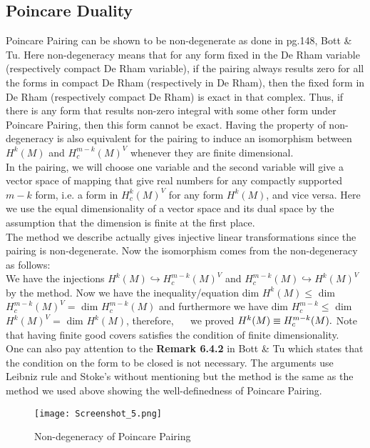 \documentclass[12pt]{amsart}
\theoremstyle{remark}
\begin{document}
\subsection{Poincare Duality}
\indent \indent Poincare Pairing can be shown to be non-degenerate as done in pg.148, Bott \& Tu. Here non-degeneracy means that for any form fixed in the De Rham variable (respectively compact De Rham variable), if the pairing always results zero for all the forms in compact De Rham (respectively in De Rham), then the fixed form in De Rham (respectively compact De Rham) is exact in that complex. Thus, if there is any form that results non-zero integral with some other form under Poincare Pairing, then this form cannot be exact. Having the property of non-degeneracy is also equivalent for the pairing to induce an isomorphism between $H^k (M)$ and $H_c^{m-k} (M)^V$ whenever they are finite dimensional. \\
\indent In the pairing, we will choose one variable and the second variable will give a vector space of mapping that give real numbers for any compactly supported $m-k$ form, i.e. a form in $H_c^k(M)^V$ for any form $H^k(M)$, and vice versa. Here we use the equal dimensionality of a vector space and its dual space by the assumption that the dimension is finite at the first place. \\
\indent The method we describe actually gives injective linear transformations since the pairing is non-degenerate. Now the isomorphism comes from the non-degeneracy as follows: \\
\indent We have the injections $H^k (M) \hookrightarrow H_c^{m-k} (M)^V$ and $H_c^{m-k}(M) \hookrightarrow H^{k}(M)^V$ by the method. Now we have the inequality/equation dim $H^k (M) \leq $ dim $H_c^{m-k} (M)^V = $ dim $H_c^{m-k} (M)$ and furthermore we have dim $H_c^{m-k} \leq $ dim $H^k(M)^V = $ dim $ H^k(M)$, therefore, $\quad$ we proved $ \\ H^k(M) \equiv H_c^{m-k}(M).$ Note that having finite good covers satisfies the condition of finite dimensionality.\\
\indent One can also pay attention to the \textbf{Remark 6.4.2} in Bott \& Tu which states that the condition on the form to be closed is not necessary. The arguments use Leibniz rule and Stoke's without mentioning but the method is the same as the method we used above showing the well-definedness of Poincare Pairing.
\begin{figure}[h]
    \centering
    \texttt{[image: Screenshot\_5.png]}
    \caption{Non-degeneracy of Poincare Pairing}
    \label{fig:ohno}
\end{figure}
\end{document}
